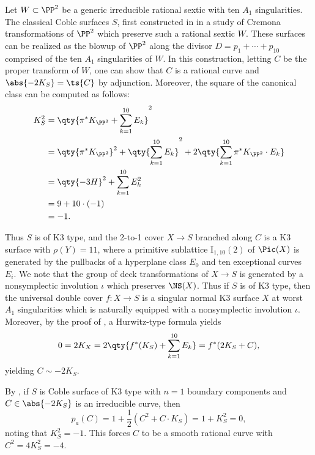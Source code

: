 \documentclass[../../main.tex]{subfiles}
\begin{document}
\begin{remark}
Let $W\subset \PP^2$ be a generic irreducible rational sextic with ten $A_1$ singularities. The classical Coble surfaces $S$, first constructed in \cite{Cob19} in a study of Cremona transformations of $\PP^2$ which preserve such a rational sextic $W$. These surfaces can be realized as the blowup of $\PP^2$ along the divisor $D = p_1 + \cdots + p_{10}$ comprised of the ten $A_1$ singularities of $W$. In this construction, letting $C$ be the proper transform of $W$, one can show that $C$ is a rational curve and $\abs{-2K_S} = \ts{C}$ by adjunction. Moreover, the square of the canonical class can be computed as follows:
\begin{align*}
    K_S^2 &= \qty{ \pi^* K_{\PP^2} + \sum_{k=1}^{10}E_k}^2 \\
    &=\qty{\pi^* K_{\PP^2}}^2 + \qty{\sum_{k=1}^{10}E_k}^2 + 2\qty{ \sum_{k=1}^{10}\pi^* K_{\PP^2}\cdot E_k } \\
    &=\qty{-3H }^2 + \sum_{k=1}^{10}E_k^2  \\
    &= 9 + 10\cdot(-1) \\
    &= -1.
\end{align*}


Thus $S$ is of K3 type, and the 2-to-1 cover $X\to S$ branched along $C$ is a K3 surface with $\rho(Y) = 11$, where a primitive sublattice $\mathrm{I}_{1, 10}(2)$ of $\Pic(X)$ is generated by the pullbacks of a hyperplane class $E_0$ and ten exceptional curves $E_i$. We note that the group of deck transformations of $X\to S$ is generated by a nonsymplectic involution $\iota$ which preserves $\NS(X)$. 
Thus if $S$ is of K3 type, then the universal double cover $f: X\to S$ is a singular normal K3 surface $X$ at worst $A_1$ singularities which is naturally equipped with a nonsymplectic involution $\iota$. Moreover, by the proof of \cite[Lem. 2.2]{AD19}, a Hurwitz-type formula yields
\[
0 = 2K_X = 2\qty{ f^*(K_S) + \sum_{k=1}^{10} E_k } = f^*(2K_S + C)
,\]
yielding $C\sim -2K_S$.
\end{remark}

\begin{remark}
By \cite[\S 3.1]{CD12}, if $S$ is Coble surface of K3 type with $n=1$ boundary components and $C \in \abs{-2K_S}$ is an irreducible curve, then
\[
p_{a}(C)=1+\frac{1}{2}\left(C^{2}+C \cdot K_{S}\right)=1+K_{S}^{2}=0,
\]
noting that $K_S^2 = -1$.
This forces $C$ to be a smooth rational curve with $C^2 = 4K_S^2 = -4$.
\end{remark}
\end{document}

